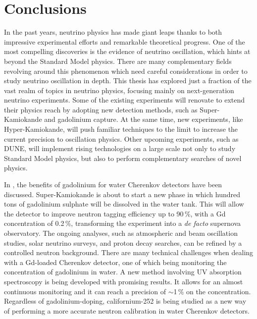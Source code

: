 \clearpage
\chapter{Conclusions}
\label{sec:conclusions}

In the past years, neutrino physics has made giant leaps thanks to both impressive experimental efforts %
and remarkable theoretical progress.
One of the most compelling discoveries is the evidence of neutrino oscillation, %
which hints at beyond the Standard Model physics.
There are many complementary fields revolving around this phenomenon which need careful considerations  %
in order to study neutrino oscillation in depth.
This thesis has explored just a fraction of the vast realm of topics in neutrino physics, %
focusing mainly on next-generation neutrino experiments.
Some of the existing experiments will renovate to extend their physics %
reach by adopting new detection methods, such as Super-Kamiokande and gadolinium capture.
At the same time, new experiments, like Hyper-Kamiokande, will %
push familiar techniques to the limit to increase the current precision to oscillation physics.
Other upcoming experiments, such as DUNE, will implement rising technologies on a large scale %
not only to study Standard Model physics, but also to perform complementary searches of novel physics.

In , the benefits of gadolinium for water Cherenkov detectors have been discussed.
Super-Kamiokande is about to start a new phase in which hundred tons of gadolinium sulphate %
will be dissolved in the water tank.
This will allow the detector to improve neutron tagging efficiency up to 90\,\%, with a Gd concentration of 0.2\,\%, %
transforming the experiment into a \emph{de facto} supernova observatory.
The ongoing analyses, such as atmospheric and beam oscillation studies, solar neutrino surveys, and proton decay searches, %
can be refined by a controlled neutron background.
There are many technical challenges when dealing with a Gd-loaded Cherenkov detector, %
one of which being monitoring the concentration of gadolinium in water.
A new method involving UV absorption spectroscopy is being developed with promising results.
It allows for an almost continuous monitoring and it can reach a precision of $\sim$1\,\% on the concentration.
Regardless of gadolinium-doping, californium-252 is being studied as a new way of %
performing a more accurate neutron calibration in water Cherenkov detectors.

